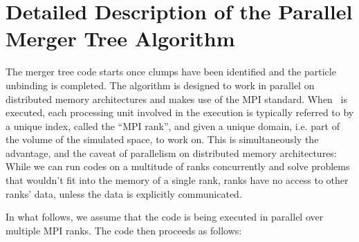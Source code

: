 \section{Detailed Description of the Parallel Merger Tree Algorithm}\label{app:detailed_mergertree}


The merger tree code starts once clumps have been identified and the 
particle unbinding is completed. The algorithm is designed to work in 
parallel on distributed memory architectures and makes use of the MPI 
standard. When \ramses\ is executed, each processing unit involved in 
the execution is typically referred to by a unique index,  called the 
``MPI rank'', and given a unique domain, i.e. part of the volume of 
the simulated space, to work on. This is simultaneously the advantage,
and the caveat of parallelism on distributed memory architectures:
While we can run codes on a multitude of ranks concurrently and solve
problems that wouldn't fit into the memory of a single rank, ranks 
have no access to other ranks' data, unless the data is explicitly 
communicated.

In what follows, we assume that the code is being executed in parallel 
over multiple MPI ranks. The code then proceeds as follows:

